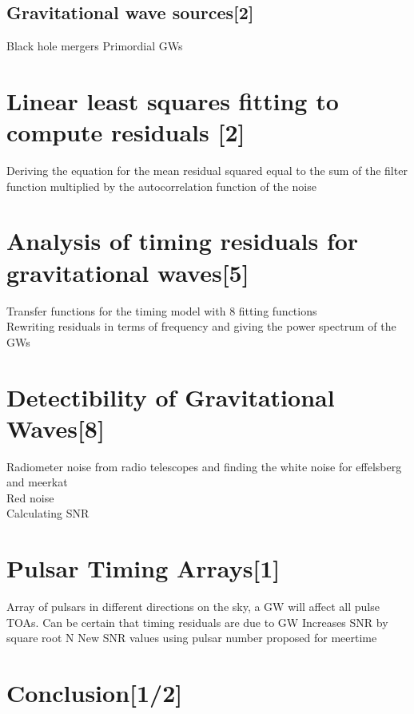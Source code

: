 \documentclass[12pt]{article}
\begin{document}
\subsection{Gravitational wave sources[2]}
Black hole mergers
Primordial GWs
\section{Linear least squares fitting to compute residuals [2]}
Deriving the equation for the mean residual squared equal to the sum of the filter function multiplied by the autocorrelation function of the noise
\section{Analysis of timing residuals for gravitational waves[5]}
Transfer functions for the timing model with 8 fitting functions\\
Rewriting residuals in terms of frequency and giving the power spectrum of the GWs 
\section{Detectibility of Gravitational Waves[8]}
Radiometer noise from radio telescopes and finding the white noise for effelsberg and meerkat\\
Red noise\\ 
Calculating SNR 
\section{Pulsar Timing Arrays[1]}
Array of pulsars in different directions on the sky, a GW will affect all pulse TOAs. Can be certain that timing residuals are due to GW 
Increases SNR by square root N
New SNR values using pulsar number proposed for meertime\\
\section{Conclusion[1/2]}
\end{document}
